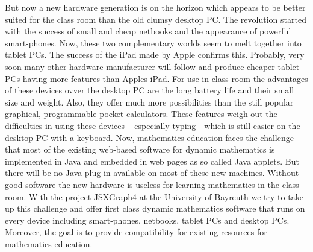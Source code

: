 \documentclass[12pt,a4paper]{article}%
\begin{document}
But now a new hardware generation is on the horizon which appears to be better suited for the class room than the old clumsy desktop PC. The revolution started with the success of small and cheap netbooks and the appearance of powerful smart-phones. Now, these two complementary worlds seem to melt together into tablet PCs. The success of the iPad made by Apple confirms this. Probably, very soon many other hardware manufacturer will follow and produce cheaper tablet PCs having more features than Apples iPad.
For use in class room the advantages of these devices ovver the desktop PC are the long battery life and their small size and weight. Also, they offer much more possibilities than the still popular graphical, programmable pocket calculators. These features weigh out the difficulties in using these devices – especially typing - which is still easier on the desktop PC with a keyboard.
Now, mathematics education faces the challenge that most of the existing web-based software for dynamic mathematics is implemented in Java and embedded in web pages as so called Java applets.  But there will be no Java plug-in available on most of these new machines. 
Without good software the new hardware is useless for learning mathematics in the class room.
With the project JSXGraph4 at the University of Bayreuth we try to take up this challenge and offer first class dynamic mathematics software that runs on every device including smart-phones, netbooks, tablet PCs and desktop PCs. Moreover, the goal is to provide compatibility for existing resources for mathematics education. 
\end{document}
